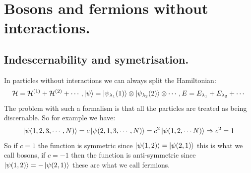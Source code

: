 \documentclass[10pt,a4paper]{book}
\begin{document}
\section{Bosons and fermions without interactions.}
\subsection{Indescernability and symetrisation.}
In particles without interactions we can always split the Hamiltonian:
\[
\mathcal{H} = \mathcal{H}^{(1)} + \mathcal{H}^{(2)} + \cdots, \ket \psi = \ket{\psi_{\lambda_1}(1)} \otimes \ket{\psi_{\lambda_2}(2) }\otimes \cdots, E = E_{\lambda_1} + E_{\lambda_2} + \cdots
\]
The problem with such a formalism is that all the particles are treated as being discernable. So for example we have:
\[
\ket{\psi(1, 2, 3, \cdots, N)} = c \ket{\psi(2, 1, 3, \cdots, N)} = c^2 \ket{\psi(1, 2, \cdots N)} \Rightarrow c^2 = 1
\]
So if $c = 1$ the function is symmetric since $\ket{\psi(1,2)} = \ket{\psi(2, 1)}$ this is what we call bosons, if $c = -1$ then the function is anti-symmetric since $\ket{\psi(1,2)} = -\ket{\psi(2, 1)}$ these are what we call fermions.
\end{document}
